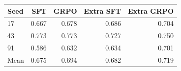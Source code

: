 \begin{tabular}{@{}lrrrr@{}}
\toprule
Seed & SFT & GRPO & Extra SFT & Extra GRPO \\
\midrule
17 & 0.667 & 0.678 & 0.686 & 0.704 \\
43 & 0.773 & 0.773 & 0.727 & 0.750 \\
91 & 0.586 & 0.632 & 0.634 & 0.701 \\
Mean & 0.675 & 0.694 & 0.682 & 0.719 \\
\bottomrule
\end{tabular}
